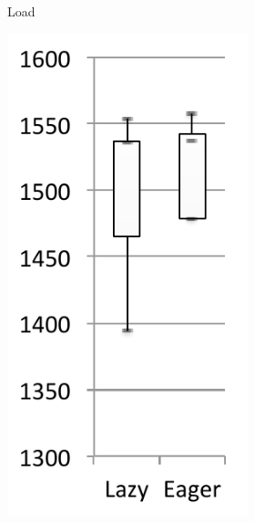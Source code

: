 \documentclass[sigplan,10pt,screen]{acmart}\settopmatter{printfolios=true,printccs=true,printacmref=true}
\begin{document}
\begin{figure}[bth]
\begin{subfigure}[b]{.48\textwidth}
\begin{subfigure}[b]{.28\textwidth}
    		\caption{Load}
       	\end{subfigure}\hspace{.03\textwidth}%
       	\begin{subfigure}[b]{.28\textwidth}
    		\includegraphics[width=\linewidth]{figures/wildflyExpExecTime} 

\end{subfigure}
\end{subfigure}
\end{figure}
\end{document}
